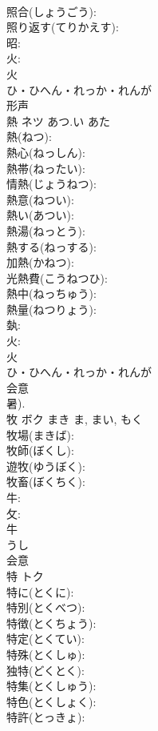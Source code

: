 \documentclass[8pt]{extreport}
\begin{document}
\begin{CJK}{UTF8}{min}
\\	照合(しょうごう): 
\\	照り返す(てりかえす): 
\\	昭: 
\\	火: 
\\	火	
\\	ひ・ひへん・れっか・れんが	
\\	形声 
\\	熱	ネツ	あつ.い	あた	
\\	熱(ねつ): 
\\	熱心(ねっしん): 
\\	熱帯(ねったい): 
\\	情熱(じょうねつ): 
\\	熱意(ねつい): 
\\	熱い(あつい): 
\\	熱湯(ねっとう): 
\\	熱する(ねっする): 
\\	加熱(かねつ): 
\\	光熱費(こうねつひ): 
\\	熱中(ねっちゅう): 
\\	熱量(ねつりょう): 
\\	埶: 
\\	火: 
\\	火	
\\	ひ・ひへん・れっか・れんが	
\\	会意 
\\	暑). 
\\	牧	ボク	まき	ま, まい, もく	
\\	牧場(まきば): 
\\	牧師(ぼくし): 
\\	遊牧(ゆうぼく): 
\\	牧畜(ぼくちく): 
\\	牛: 
\\	攵: 
\\	牛	
\\	うし	
\\	会意 
\\	特	トク			
\\	特に(とくに): 
\\	特別(とくべつ): 
\\	特徴(とくちょう): 
\\	特定(とくてい): 
\\	特殊(とくしゅ): 
\\	独特(どくとく): 
\\	特集(とくしゅう): 
\\	特色(とくしょく): 
\\	特許(とっきょ): 

\end{CJK}
\end{document}
